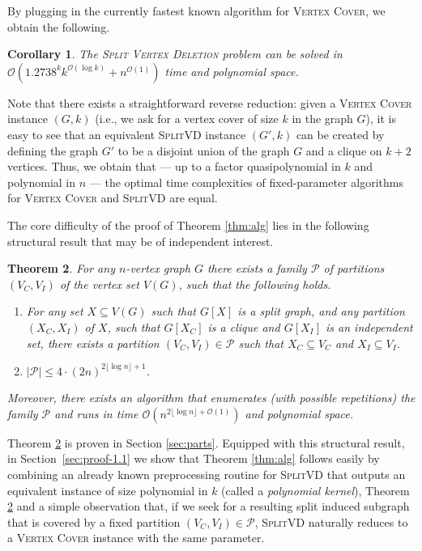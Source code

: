 \documentclass{article}
\newcommand{\Oh}{\ensuremath{\mathcal{O}}}
\newcommand{\splitlong}{\textsc{Split Vertex Deletion}\xspace}
\newcommand{\splitvd}{\textsc{SplitVD}\xspace}
\newcommand{\vertexcover}{\textsc{Vertex Cover}\xspace}
\newtheorem{theorem}{Theorem}[section]
\newtheorem{corollary}[theorem]{Corollary}
\theoremstyle{definition}
\begin{document}
By plugging in the currently fastest known algorithm for \vertexcover \cite{vc:best},
   we obtain the following.

\begin{corollary}
The \splitlong problem can be solved in 
\linebreak 
$\Oh(1.2738^k k^{\Oh(\log k)} + n^{\Oh(1)})$ time and polynomial space.
\end{corollary}

Note that there exists a straightforward reverse reduction:
given a \vertexcover instance $(G,k)$ (i.e., we ask for a vertex cover of size $k$
in the graph $G$), it is easy to see that an equivalent
\splitvd instance $(G',k)$ can be created by defining the graph $G'$ to be
a disjoint union of the graph $G$ and a clique on $k+2$ vertices.
Thus, we obtain that --- up to a factor quasipolynomial in $k$ and polynomial in $n$ ---
the optimal
time complexities of fixed-parameter algorithms for \vertexcover and \splitvd are equal.

The core difficulty of the proof of Theorem \ref{thm:alg} lies in the following
structural result that may be of independent interest.
\begin{theorem}\label{thm:parts}
For any $n$-vertex graph $G$ there exists a family $\mathcal{P}$
of partitions $(V_C,V_I)$ of the vertex set $V(G)$, such that
the following holds.
\begin{enumerate}
\item For any set $X \subseteq V(G)$ such that $G[X]$ is a split graph,
  and any partition $(X_C,X_I)$ of $X$, such that $G[X_C]$ is a clique
  and $G[X_I]$ is an independent set, there exists
  a partition $(V_C,V_I) \in \mathcal{P}$ such that
  $X_C \subseteq V_C$ and $X_I \subseteq V_I$.
\item $|\mathcal{P}| \leq 4 \cdot (2n)^{2\lfloor \log n \rfloor + 1}$.
\end{enumerate}
Moreover, there exists an algorithm that enumerates (with possible repetitions) the family $\mathcal{P}$
and runs in time $\Oh(n^{2 \lfloor \log n \rfloor + \Oh(1)})$ and polynomial space.
\end{theorem}

Theorem \ref{thm:parts} is proven in Section \ref{sec:parts}.
Equipped with this structural result, in Section~\ref{sec:proof-1.1} we
show that Theorem \ref{thm:alg} follows
easily by combining an already known preprocessing routine for \splitvd that
outputs an equivalent instance of size polynomial in $k$ (called a {\em{polynomial kernel}}),
Theorem \ref{thm:parts} and a simple observation that, if we seek for a resulting
split induced subgraph that is covered by a fixed
partition $(V_C,V_I) \in \mathcal{P}$, \splitvd naturally reduces to a \vertexcover
instance with the same parameter.
\end{document}
